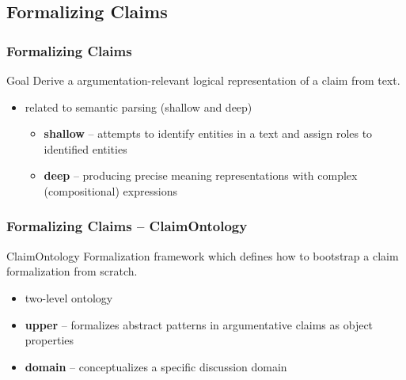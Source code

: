\documentclass{beamer}
\begin{document}
\subsection{Formalizing Claims}

\begin{frame}
	\frametitle{Formalizing Claims}

	\begin{block}{Goal}
	Derive a argumentation-relevant logical representation of a claim from text. 
	\end{block}
	\vspace{0.3cm}

	\begin{itemize}
		\item related to semantic parsing (shallow and deep)
		\begin{itemize}
			\item \textbf{shallow} -- attempts to identify entities in a text and assign roles to identified entities \cite{pradhan2004shallow} 
			\item \textbf{deep} -- producing precise meaning representations with complex (compositional) expressions \cite{pasupat2015compositional} 
		\end{itemize}
	\end{itemize}
\end{frame}

\begin{frame}
	\frametitle{Formalizing Claims -- ClaimOntology}
	\begin{block}{ClaimOntology}
	Formalization framework which defines how to bootstrap a claim formalization
	from scratch.
	\end{block}

	\begin{itemize}
		\item two-level ontology
		\item \textbf{upper} -- formalizes abstract patterns in argumentative claims as object
properties
		\item \textbf{domain} -- conceptualizes a specific discussion domain
	\end{itemize}
\end{frame}
\end{document}
